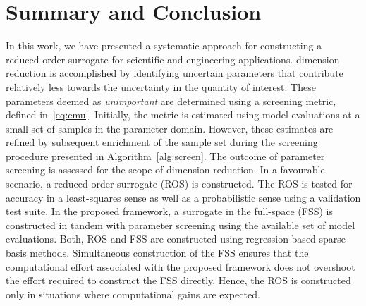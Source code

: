 \section{Summary and Conclusion}
\label{sec:disc}


In this work, we have presented a systematic approach for constructing a reduced-order
surrogate for scientific and engineering applications. dimension reduction is accomplished
by identifying uncertain parameters that contribute relatively less towards the uncertainty
in the quantity of interest. These parameters deemed as \textit{unimportant} are determined
using a screening metric, defined in~\eqref{eq:cmu}. Initially, the metric is estimated
using model evaluations at a small set of samples in the parameter domain. However, these
estimates are refined by subsequent enrichment of the sample set during the screening
procedure presented in Algorithm~\ref{alg:screen}. The outcome of parameter screening is
assessed for the scope of dimension reduction. In a favourable scenario, a reduced-order
surrogate (ROS) is constructed. The ROS is tested for accuracy in a least-squares sense
as well as a probabilistic sense using a validation test suite. In the proposed framework,
a surrogate in the full-space (FSS) is constructed in tandem with parameter screening using
the available set of model evaluations. Both, ROS and FSS are
constructed using regression-based sparse basis methods. Simultaneous construction
of the FSS ensures that the computational effort associated with the proposed framework
does not overshoot the effort required to construct the FSS directly.
Hence, the ROS is constructed only in situations where computational gains are
expected. 

